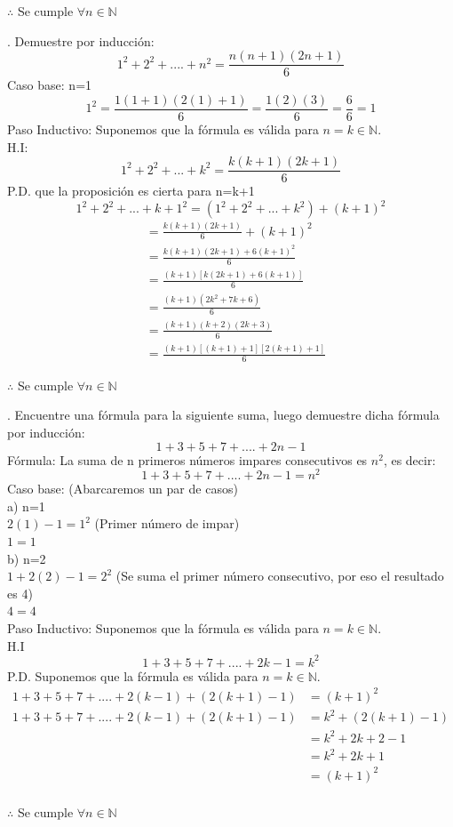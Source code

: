 \documentclass[letterpaper]{article}
\renewcommand{\*}{\cdot}
\theoremstyle{definition}
\begin{document}
\begin{center}
$\therefore$ Se cumple  $\forall{n} \in \mathbb{N}$
\end{center}
. Demuestre por inducción:
$$1^2+2^2+....+n^2=\frac{n(n+1)(2n+1)}{6}$$
Caso base: n=1
$$1^2=\frac{1(1+1)(2(1)+1)}{6}=\frac{1(2)(3)}{6}=\frac{6}{6}=1$$
Paso Inductivo: Suponemos que la fórmula es válida para $n=k \in \mathbb{N}.$\\
H.I:$$1^2+2^2+...+k^2=\frac{k(k+1)(2k+1)}{6}$$
P.D. que la proposición es cierta para n=k+1
$$ 1^2+2^2+...+k+1^2=(1^2+2^2+...+k^2)+(k+1)^2  $$
\begin{align*}
	&=\frac{k(k+1)(2k+1)}{6}+(k+1)^2\\
	&=\frac{k(k+1)(2k+1)+6(k+1)^2}{6}\\
	&=\frac{(k+1)[k(2k+1)+6(k+1)]}{6}\\
	&=\frac{(k+1)(2k^2+7k+6)}{6}\\
	&=\frac{(k+1)(k+2)(2k+3)}{6}\\
	&=\frac{(k+1)[(k+1)+1][2(k+1)+1]}{6}
\end{align*}
\begin{center}
	$\therefore$ Se  cumple $\forall{n} \in \mathbb{N}$	
\end{center}

. Encuentre una fórmula para la siguiente suma, luego 
demuestre dicha fórmula por inducción:
$$1+3+5+7+....+2n-1$$
Fórmula: La suma de n primeros números impares consecutivos es $n^2$, es decir:\\
$$1+3+5+7+....+2n-1=n^2$$
Caso base: (Abarcaremos un par de casos)\\
a) n=1\\
$2(1)-1=1^2$ (Primer número de impar)\\
$1=1$\\
b) n=2\\
$1+2(2)-1=2^2$ (Se suma el primer número consecutivo, por eso el resultado es 4)\\
$4=4$\\
Paso Inductivo: Suponemos que la fórmula es válida para $n=k \in \mathbb{N}.$\\
H.I 
$$1+3+5+7+....+2k-1=k^2$$
P.D. Suponemos que la fórmula es válida para $n=k \in \mathbb{N}.$\\
\begin{align*}
	1+3+5+7+....+2(k-1)+(2(k+1)-1)&=(k+1)^2\\
	1+3+5+7+....+2(k-1)+(2(k+1)-1)&=k^2+(2(k+1)-1)\\
	&=k^2+2k+2-1\\
	&=k^2+2k+1\\
	&=(k+1)^2\\
\end{align*}
\begin{center}
	$\therefore$ Se cumple $\forall{n} \in \mathbb{N}$\\
\end{center}
\end{document}
